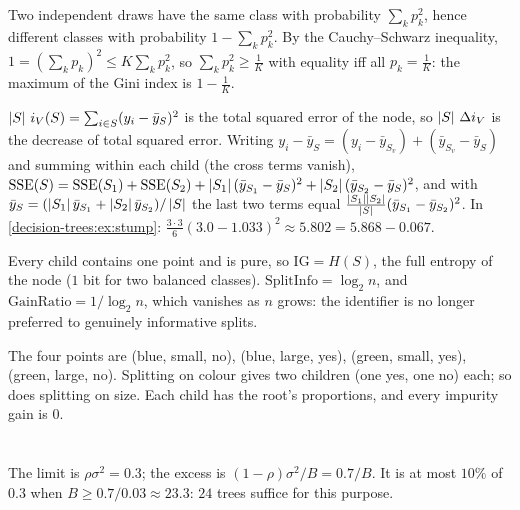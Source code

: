 \section{}

Two independent draws have the same class with probability $\sum_kp_k^2$, hence different classes with
probability $1 - \sum_kp_k^2$. By the Cauchy--Schwarz inequality, $1 = (\sum_kp_k)^2\leq K\sum_kp_k^2$, so $\sum_kp_k^2\geq\frac1K$ with
equality iff all $p_k = \frac1K$: the maximum of the Gini index is $1 - \frac1K$.

$\left|S\right|\,i_V(S) = \sum_{i\in S}(y_i - \bar y_S)^2$ is the total squared error of the node, so $\left|S\right|\,\Delta i_V$ is the decrease
of total squared error. Writing $y_i - \bar y_S = (y_i - \bar y_{S_v}) + (\bar y_{S_v} - \bar y_S)$ and summing within each child (the
cross terms vanish), $\mathrm{SSE}(S) = \mathrm{SSE}(S_1) + \mathrm{SSE}(S_2) + \left|S_1\right|(\bar y_{S_1} - \bar y_S)^2 + \left|S_2\right|(\bar y_{S_2} - \bar y_S)^2$, and with
$\bar y_S = (\left|S_1\right|\bar y_{S_1} + \left|S_2\right|\bar y_{S_2})/\left|S\right|$ the last two terms equal $\frac{\left|S_1\right|\left|S_2\right|}{\left|S\right|}(\bar y_{S_1} - \bar y_{S_2})^2$. In
\cref{decision-trees:ex:stump}: $\frac{3\cdot3}6(3.0 - 1.033)^2\approx5.802 = 5.868 - 0.067$.

Every child contains one point and is pure, so $\mathrm{IG} = H(S)$, the full entropy of the node ($1$
bit for two balanced classes). $\mathrm{SplitInfo} = \log_2n$, and $\mathrm{GainRatio} = 1/\log_2n$, which vanishes as $n$
grows: the identifier is no longer preferred to genuinely informative splits.

The four points are (blue, small, no), (blue, large, yes), (green, small, yes), (green, large, no).
Splitting on colour gives two children (one yes, one no) each; so does splitting on size.
Each child has the root's proportions, and every impurity gain is $0$.

\section{}

The limit is $\rho\sigma^2 = 0.3$; the excess is $(1 - \rho)\sigma^2/B = 0.7/B$. It is at most $10\%$ of $0.3$ when
$B\geq0.7/0.03\approx23.3$: $24$ trees suffice for this purpose.

